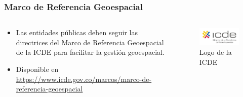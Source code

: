 \begin{frame}[allowframebreaks]

  \frametitle{Marco de Referencia Geoespacial}

  \begin{columns}
    \begin{column}{.5\textwidth}
      \begin{itemize}
        \item Las entidades públicas deben seguir las directrices del Marco de Referencia Geoespacial de la ICDE para facilitar la gestión geoespacial.
        \item Disponible en \url{https://www.icde.gov.co/marcos/marco-de-referencia-geoespacial}
      \end{itemize}  
    \end{column}

    \begin{column}{.5\textwidth}
      \begin{figure}[ht]
        \centering
        \includegraphics[width=\textwidth]{img/ICDE.png}
        \caption{Logo de la ICDE\cite{ICDE2025}}
      \end{figure}

    \end{column}
  \end{columns}  


\end{frame}

